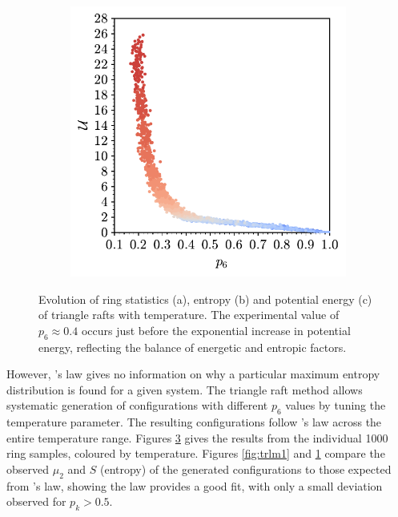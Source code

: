 \begin{figure}[bt]
\begin{subfigure}[b]{0.45\textwidth}
         \caption{}
         \label{fig:trlm2}
     \end{subfigure}
     \hfill
     \begin{subfigure}[b]{0.45\textwidth}
         \centering
         \includegraphics[width=\textwidth]{./figures/bilayers/tri_raft_lm_2.pdf}
         \caption{}
         \label{fig:trlm3}
     \end{subfigure}
     \hfill

     \caption{Evolution of ring statistics (a), entropy (b) and potential energy (c) of triangle rafts with temperature. The experimental value of $p_6\approx 0.4$ occurs just before the exponential increase in potential energy, reflecting the balance of energetic and entropic factors.}
     \label{fig:trlm}
\end{figure}


However, \lm's law gives no information on why a particular maximum entropy distribution is found for a given system.
The triangle raft method allows systematic generation of configurations with different $p_6$ values by tuning the temperature parameter. 
The resulting configurations follow \lm's law across the entire temperature range. 
Figures \ref{fig:trlm} gives the results from the individual 1000 ring samples, coloured by temperature.
Figures \ref{fig:trlm1} and \ref{fig:trlm2} compare the observed $\mu_2$ and $S$ (entropy) of the generated configurations to those expected from \lm's law, showing the law provides a good fit, with only a small deviation observed for $p_k>0.5$. 

